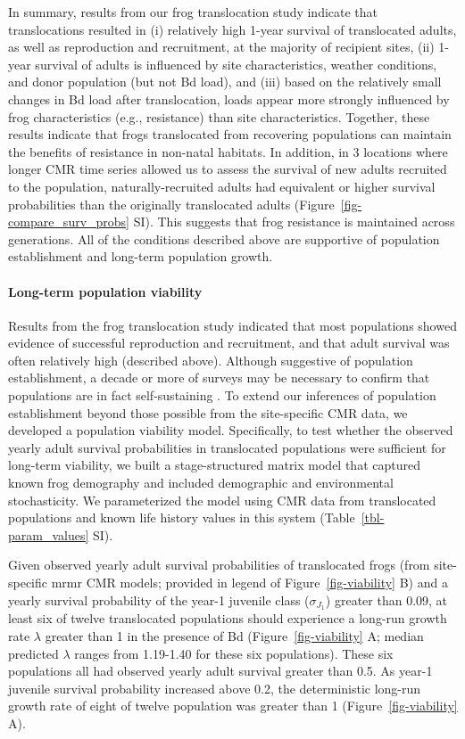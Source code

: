 \documentclass[
  letterpaper,
  DIV=11,
  numbers=noendperiod]{scrartcl}
\let\oldparagraph\paragraph
\renewcommand{\paragraph}[1]{\oldparagraph{#1}\mbox{}}
\begin{document}
In summary, results from our frog translocation study indicate that
translocations resulted in (i) relatively high 1-year survival of
translocated adults, as well as reproduction and recruitment, at the
majority of recipient sites, (ii) 1-year survival of adults is
influenced by site characteristics, weather conditions, and donor
population (but not Bd load), and (iii) based on the relatively small
changes in Bd load after translocation, loads appear more strongly
influenced by frog characteristics (e.g., resistance) than site
characteristics. Together, these results indicate that frogs
translocated from recovering populations can maintain the benefits of
resistance in non-natal habitats. In addition, in 3 locations where
longer CMR time series allowed us to assess the survival of new adults
recruited to the population, naturally-recruited adults had equivalent
or higher survival probabilities than the originally translocated adults
(Figure~\ref{fig-compare_surv_probs} SI). This suggests that frog
resistance is maintained across generations. All of the conditions
described above are supportive of population establishment and long-term
population growth.

\hypertarget{long-term-population-viability}{%
\paragraph{Long-term population
viability}\label{long-term-population-viability}}

Results from the frog translocation study indicated that most
populations showed evidence of successful reproduction and recruitment,
and that adult survival was often relatively high (described above).
Although suggestive of population establishment, a decade or more of
surveys may be necessary to confirm that populations are in fact
self-sustaining \citep{joseph2018}. To extend our inferences of
population establishment beyond those possible from the site-specific
CMR data, we developed a population viability model. Specifically, to
test whether the observed yearly adult survival probabilities in
translocated populations were sufficient for long-term viability, we
built a stage-structured matrix model that captured known frog
demography and included demographic and environmental stochasticity. We
parameterized the model using CMR data from translocated populations and
known life history values in this system (Table~\ref{tbl-param_values}
SI).

Given observed yearly adult survival probabilities of translocated frogs
(from site-specific mrmr CMR models; provided in legend of
Figure~\ref{fig-viability} B) and a yearly survival probability of the
year-1 juvenile class (\(\sigma_{J_1}\)) greater than 0.09, at least six
of twelve translocated populations should experience a long-run growth
rate \(\lambda\) greater than 1 in the presence of Bd
(Figure~\ref{fig-viability} A; median predicted \(\lambda\) ranges from
1.19-1.40 for these six populations). These six populations all had
observed yearly adult survival greater than 0.5. As year-1 juvenile
survival probability increased above 0.2, the deterministic long-run
growth rate of eight of twelve population was greater than 1
(Figure~\ref{fig-viability} A).
\end{document}
